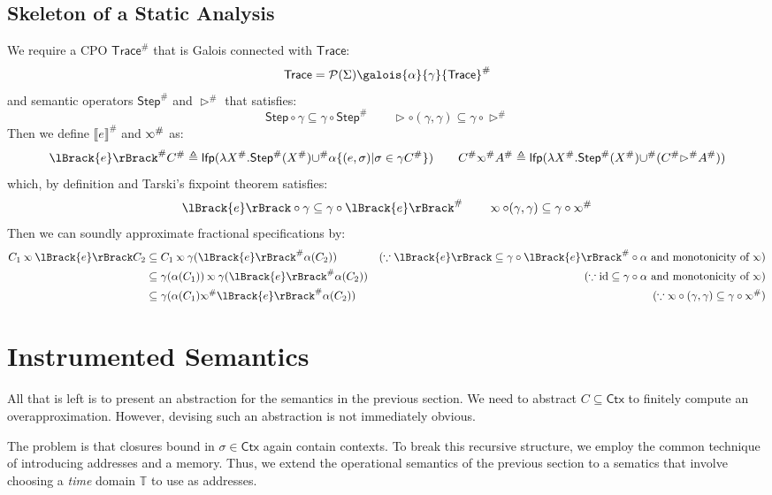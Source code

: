 \documentclass[acmsmall,screen,review]{acmart}\settopmatter{printfolios=true,printccs=false,printacmref=false}
\newcommand*{\pset}{\mathcal{P}}
\newcommand*{\Abs}[1]{{#1}^{\#}}
\newcommand*{\Time}{\mathbb{T}}
\newcommand*{\ctx}{\sigma}
\newcommand*{\Ctx}{\mathsf{Ctx}}
\newcommand*{\Trace}{\mathsf{Trace}}
\newcommand*{\lfp}{\mathsf{lfp}}
\newcommand*{\Step}{\mathsf{Step}}
\newcommand*{\semlink}{\mathbin{\rotatebox[origin=c]{180}{$\propto$}}}
\newcommand*{\sembracket}[1]{\lBrack{#1}\rBrack}
\begin{document}
\subsection{Skeleton of a Static Analysis}
We require a CPO $\Abs{\Trace}$ that is Galois connected with $\Trace$:
\[\Trace=\pset(\Sigma)\galois{\alpha}{\gamma}\Abs{\Trace}\]
and semantic operators $\Abs\Step$ and $\Abs\rhd$ that satisfies:
\[\Step\circ\gamma\subseteq\gamma\circ\Abs\Step\qquad\rhd\circ(\gamma,\gamma)\subseteq\gamma\circ\Abs\rhd\]
Then we define $\Abs{\sembracket{e}}$ and $\Abs\semlink$ as:
\[
  \Abs{\sembracket{e}}\Abs{C}\triangleq\lfp(\lambda\Abs{X}.\Abs\Step(\Abs{X})\Abs\cup\alpha\{(e,\ctx)|\ctx\in\gamma\Abs{C}\})\qquad
  \Abs{C}\Abs\semlink\Abs{A}\triangleq\lfp(\lambda\Abs{X}.\Abs\Step(\Abs{X})\Abs\cup(\Abs{C}\Abs\rhd\Abs{A}))
\]
which, by definition and Tarski's fixpoint theorem satisfies:
\[\sembracket{e}\circ\gamma\subseteq\gamma\circ\Abs{\sembracket{e}}\qquad\semlink\circ(\gamma,\gamma)\subseteq\gamma\circ\Abs\semlink\]
Then we can soundly approximate fractional specifications by:
\begin{align*}
  C_1\semlink\sembracket{e}C_2 & \subseteq C_1\semlink\gamma(\Abs{\sembracket{e}}\alpha(C_2))                 & (\because\sembracket{e}\subseteq\gamma\circ\Abs{\sembracket{e}}\circ\alpha\text{ and monotonicity of }\semlink) \\
                               & \subseteq \gamma(\alpha(C_1))\semlink\gamma(\Abs{\sembracket{e}}\alpha(C_2)) & (\because\text{id}\subseteq\gamma\circ\alpha\text{ and monotonicity of }\semlink)                               \\
                               & \subseteq\gamma(\alpha(C_1)\Abs\semlink\Abs{\sembracket{e}}\alpha(C_2))      & (\because\semlink\circ(\gamma,\gamma)\subseteq\gamma\circ\Abs\semlink)
\end{align*}
\section{Instrumented Semantics}
All that is left is to present an abstraction for the semantics in the previous section.
We need to abstract $C\subseteq\Ctx$ to finitely compute an overapproximation.
However, devising such an abstraction is not immediately obvious.

The problem is that closures bound in $\sigma\in\Ctx$ again contain contexts.
To break this recursive structure, we employ the common technique of introducing addresses and a memory.
Thus, we extend the operational semantics of the previous section to a sematics that involve choosing a \emph{time} domain $\Time$ to use as addresses.
\end{document}
